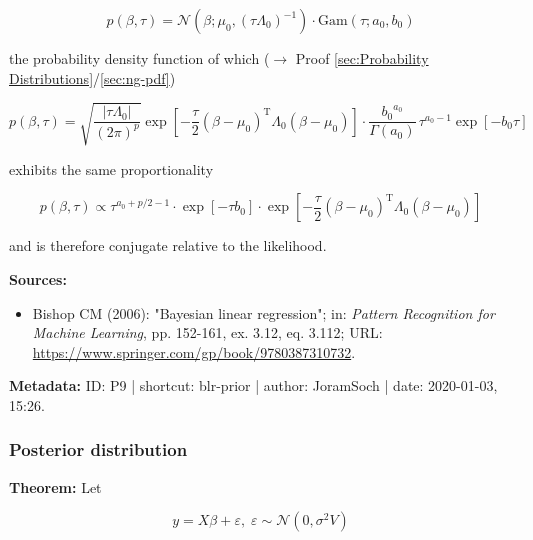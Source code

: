 \documentclass[a4paper,12pt,twoside]{book}
\begin{document}
\begin{equation} \label{eq:blr-prior-BLR-prior-s1}
p(\beta,\tau) = \mathcal{N}(\beta; \mu_0, (\tau \Lambda_0)^{-1}) \cdot \mathrm{Gam}(\tau; a_0, b_0)
\end{equation}

the probability density function of which ($\rightarrow$ Proof \ref{sec:Probability Distributions}/\ref{sec:ng-pdf})

\begin{equation} \label{eq:blr-prior-BLR-prior-s2}
p(\beta,\tau) = \sqrt{\frac{|\tau \Lambda_0|}{(2 \pi)^p}} \exp\left[ -\frac{\tau}{2} (\beta-\mu_0)^\mathrm{T} \Lambda_0 (\beta-\mu_0) \right] \cdot \frac{ {b_0}^{a_0}}{\Gamma(a_0)} \, \tau^{a_0-1} \exp[-b_0 \tau]
\end{equation}

exhibits the same proportionality

\begin{equation} \label{eq:blr-prior-BLR-prior-s3}
p(\beta,\tau) \propto \tau^{a_0+p/2-1} \cdot \exp[-\tau b_0] \cdot \exp\left[ -\frac{\tau}{2} (\beta-\mu_0)^\mathrm{T} \Lambda_0 (\beta-\mu_0) \right]
\end{equation}

and is therefore conjugate relative to the likelihood.


\vspace{1em}
\textbf{Sources:}
\begin{itemize}
\item Bishop CM (2006): "Bayesian linear regression"; in: \textit{Pattern Recognition for Machine Learning}, pp. 152-161, ex. 3.12, eq. 3.112; URL: \url{https://www.springer.com/gp/book/9780387310732}.
\end{itemize}


\vspace{1em}
\textbf{Metadata:} ID: P9 | shortcut: blr-prior | author: JoramSoch | date: 2020-01-03, 15:26.
\vspace{1em}



\subsubsection[\textbf{Posterior distribution}]{Posterior distribution} \label{sec:blr-post}
\setcounter{equation}{0}

\textbf{Theorem:} Let

\begin{equation} \label{eq:blr-post-GLM}
y = X \beta + \varepsilon, \; \varepsilon \sim \mathcal{N}(0, \sigma^2 V)
\end{equation}
\end{document}

